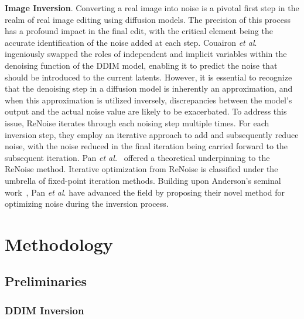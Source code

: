 \documentclass[letterpaper]{article} %
\begin{document}
\textbf{Image Inversion}.
%
%
%
Converting a real image into noise is a pivotal first step in the realm of real image editing using diffusion models.
%
The precision of this process has a profound impact in the final edit, with the critical element being the accurate identification of the noise added at each step.
%
Couairon \emph{et al}.~\cite{couairon2023diffedit} ingeniously swapped the roles of independent and implicit variables within the denoising function of the DDIM model, enabling it to predict the noise that should be introduced to the current latents.
%
However, it is essential to recognize that the denoising step in a diffusion model is inherently an approximation, and when this approximation is utilized inversely, discrepancies between the model's output and the actual noise value are likely to be exacerbated.
%
To address this issue, ReNoise \cite{garibi2024renoise} iterates through each noising step multiple times. For each inversion step, they employ an iterative approach to add and subsequently reduce noise, with the noise reduced in the final iteration being carried forward to the subsequent iteration.
%
Pan \emph{et al.}~\cite{pan2023effective} offered a theoretical underpinning to the ReNoise method. Iterative optimization from ReNoise is classified under the umbrella of fixed-point iteration methods. Building upon Anderson's seminal work~\cite{anderson1965iterative}, Pan \emph{et al}. have advanced the field by proposing their novel method for optimizing noise during the inversion process. 


\section{Methodology}
\label{methods}

\subsection{Preliminaries}

\subsubsection{DDIM Inversion}
\label{sec:ddim_inv}
\end{document}
